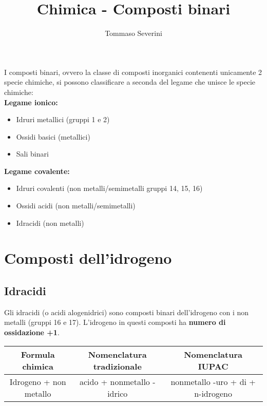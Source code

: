 \documentclass[10pt,a4paper]{article}
\author{Tommaso Severini}
\title{Chimica - Composti binari}
\begin{document}
	\maketitle
	
	I composti binari, ovvero la classe di composti inorganici contenenti unicamente 2 specie chimiche, si possono classificare a seconda del legame che unisce le specie chimiche:\\
	
\textbf{	Legame ionico:}
	
	\begin{itemize}
		\item Idruri metallici (gruppi 1 e 2)
		\item Ossidi basici (metallici)
		\item Sali binari
	\end{itemize}

\textbf{	Legame covalente:}
	
	\begin{itemize}
		\item Idruri covalenti (non metalli/semimetalli gruppi 14, 15, 16)
		\item Ossidi acidi (non metalli/semimetalli)
		\item Idracidi (non metalli)
	\end{itemize}

\section*{Composti dell'idrogeno}

 \subsection*{Idracidi}
 
 	Gli idracidi (o acidi alogenidrici) sono composti binari dell'idrogeno con i non metalli (gruppi 16 e 17). L'idrogeno in questi composti ha \textbf{numero di ossidazione +1}.\\
 	
 	\begin{tabular}{|c|c|c|}
 		\hline
 		Formula chimica & Nomenclatura tradizionale & Nomenclatura IUPAC \\
 		\hline
 		Idrogeno + non metallo & acido + nonmetallo -idrico & nonmetallo -uro + di + n-idrogeno \\
 		\hline
 	\end{tabular} \\
 
\end{document}

